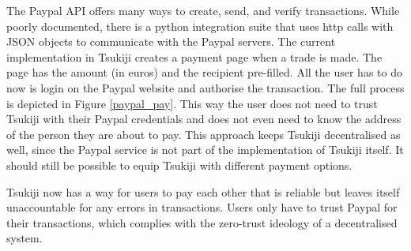 \newpage

The Paypal API offers many ways to create, send, and verify transactions.
While poorly documented, there is a python integration suite that uses http calls with JSON objects to communicate with the Paypal servers.
The current implementation in Tsukiji creates a payment page when a trade is made.
The page has the amount (in euros) and the recipient pre-filled.
All the user has to do now is login on the Paypal website and authorise the transaction.
The full process is depicted in Figure \ref{paypal_pay}.
This way the user does not need to trust Tsukiji with their Paypal credentials and does not even need to know the address of the person they are about to pay.
This approach keeps Tsukiji decentralised as well, since the Paypal service is not part of the implementation of Tsukiji itself.
It should still be possible to equip Tsukiji with different payment options.

Tsukiji now has a way for users to pay each other that is reliable but leaves itself unaccountable for any errors in transactions.
Users only have to trust Paypal for their transactions, which complies with the zero-trust ideology of a decentralised system.